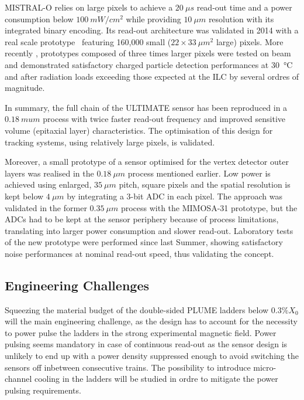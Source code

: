 MISTRAL-O relies on large pixels to achieve a $\SI{20}{\mu s}$ read-out
time and a power consumption below $\SI{100}{mW/cm^2}$ while providing
$\SI{10}{\mu m}$ resolution with its integrated binary encoding.
Its read-out architecture was validated in 2014 with a real scale
prototype~\cite{Winter:NSSMIC:2014} featuring 160,000 small ($22\times\SI{33}{\mu m^2}$
large) pixels. More recently \cite{Winter:ALCW15}, prototypes composed of
three times larger pixels were tested on beam and demonstrated satisfactory
charged particle detection performances at
\SI{30}{\degreeCelsius} and after radiation loads exceeding those expected at the
ILC by several ordres of magnitude.

In summary, the full chain of the ULTIMATE sensor has been reproduced
in a $\SI{0.18}{mu m}$ process with twice faster read-out frequency and
improved sensitive volume (epitaxial layer) characteristics. The
optimisation of this design for tracking systems, using relatively
large pixels, is validated.

Moreover, a small prototype of a sensor optimised for the vertex detector
outer layers was realised in the $\SI{0.18}{\mu m}$ process mentioned earlier.
Low power is achieved using enlarged, $\SI{35}{\mu m}$ pitch, square pixels and the
spatial resolution is kept below $\SI{4}{\mu m}$ by integrating a 3-bit ADC in
each pixel. The approach was validated in the former $\SI{0.35}{\mu m}$ process
with the MIMOSA-31 prototype, but the ADCs had to be kept at the sensor
periphery because of process limitations, translating into larger
power consumption and slower read-out. Laboratory tests of the new
prototype were performed since last Summer, showing satisfactory noise performances at nominal read-out speed, thus validating the concept.


\subsection{Engineering Challenges}
Squeezing the material budget of the double-sided PLUME ladders
below $0.3\% X_0$ will the main engineering challenge, as the design
has to account for the necessity to power pulse the ladders in the
strong experimental magnetic field. Power pulsing seems mandatory
in case of continuous read-out as the sensor design is unlikely to
end up with a power density suppressed enough to avoid switching
the sensors off inbetween consecutive trains. The possibility to
introduce micro-channel cooling in the ladders will be studied in
ordre to mitigate the power pulsing requirements.

